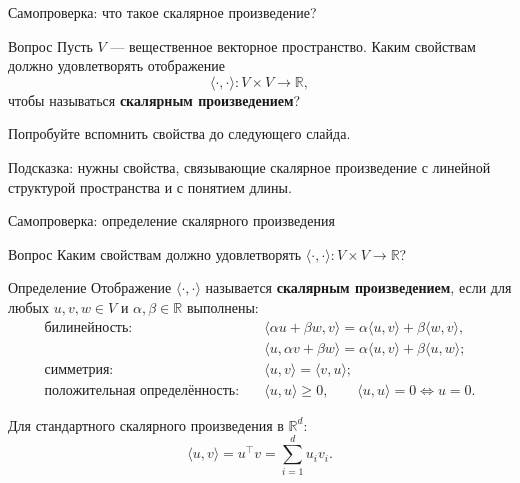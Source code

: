 \documentclass[aspectratio=169,10pt]{beamer}
\newcommand{\R}{\mathbb{R}}
\begin{document}
\begin{frame}{Самопроверка: что такое скалярное произведение?}
\vspace{0.75em}

\begin{alertblock}{Вопрос}
Пусть $V$ --- вещественное векторное пространство. Каким свойствам должно удовлетворять отображение
\[
  \langle\cdot,\cdot\rangle:V\times V\to\R,
\]
чтобы называться \textbf{скалярным произведением}?
\end{alertblock}

\vspace{0.65em}

\centering
\Large
Попробуйте вспомнить свойства до следующего слайда.

\vspace{0.55em}
\normalsize
Подсказка: нужны свойства, связывающие скалярное произведение с линейной структурой пространства и с понятием длины.

\end{frame}

\begin{frame}{Самопроверка: определение скалярного произведения}
\small

\begin{block}{Вопрос}
Каким свойствам должно удовлетворять $\langle\cdot,\cdot\rangle:V\times V\to\R$?
\end{block}

\begin{block}{Определение}
Отображение $\langle\cdot,\cdot\rangle$ называется \textbf{скалярным произведением}, если для любых $u,v,w\in V$ и $\alpha,\beta\in\R$ выполнены:
\[
\begin{aligned}
\text{билинейность:}\quad
&\langle \alpha u+\beta w,v\rangle
 =\alpha\langle u,v\rangle+\beta\langle w,v\rangle,\\[-0.05em]
&\langle u,\alpha v+\beta w\rangle
 =\alpha\langle u,v\rangle+\beta\langle u,w\rangle;\\[0.25em]
\text{симметрия:}\quad
&\langle u,v\rangle=\langle v,u\rangle;\\[0.25em]
\text{положительная определённость:}\quad
&\langle u,u\rangle\ge0,
\qquad
\langle u,u\rangle=0\Longleftrightarrow u=0.
\end{aligned}
\]
\end{block}

Для стандартного скалярного произведения в $\R^d$:
\[
  \langle u,v\rangle=u^\top v=\sum_{i=1}^d u_i v_i.
\]

\end{frame}
\end{document}
